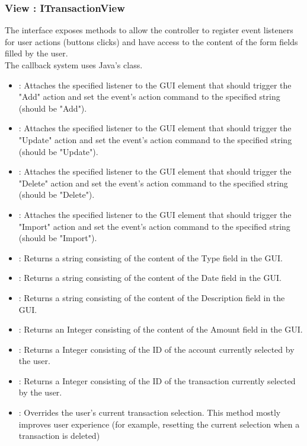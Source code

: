 \documentclass[12pt]{article}
\begin{document}
\subsubsection{View : ITransactionView}
The  interface exposes methods to allow the controller to register event listeners for user actions (buttons clicks) and have access to the content of the form fields filled by the user.\\
The callback system uses Java's  class.
\begin{itemize}
	\item {} : Attaches the specified listener to the GUI element that should trigger the "Add" action and set the event's action command to the specified string (should be "Add").
	\item {} : Attaches the specified listener to the GUI element that should trigger the "Update" action and set the event's action command to the specified string (should be "Update").
	\item {} : Attaches the specified listener to the GUI element that should trigger the "Delete" action and set the event's action command to the specified string (should be "Delete").
		\item {} : Attaches the specified listener to the GUI element that should trigger the "Import" action and set the event's action command to the specified string (should be "Import").
	\item {} : Returns a string consisting of the content of the Type field in the GUI.
	\item {} : Returns a string consisting of the content of the Date field in the GUI.
	\item {} : Returns a string consisting of the content of the Description field in the GUI.
	\item {} : Returns an Integer consisting of the content of the Amount field in the GUI.
	\item {} : Returns a Integer consisting of the ID of the account currently selected by the user.
	\item {} : Returns a Integer consisting of the ID of the transaction currently selected by the user.
	\item {} : Overrides the user's current transaction selection. This method mostly improves user experience (for example, resetting the current selection when a transaction is deleted)
\end{itemize}
\end{document}

